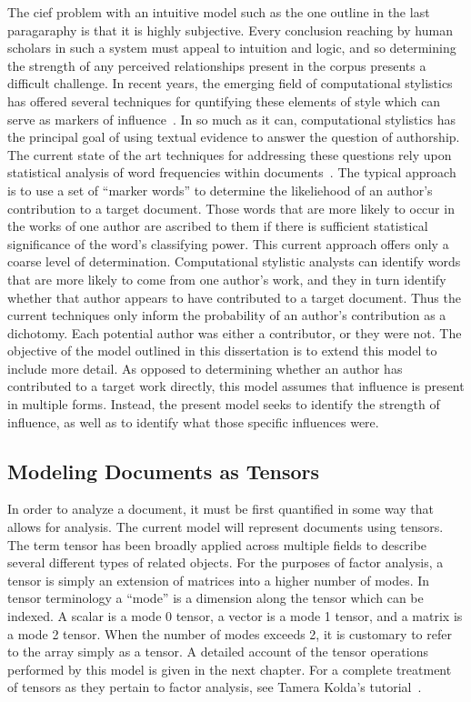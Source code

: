 \documentclass[../dissertation.tex]{subfiles}
\begin{document}
The cief problem with an intuitive model such as the one outline in
the last paragaraphy is that it is highly subjective.  Every
conclusion reaching by human scholars in such a system must appeal to
intuition and logic, and so determining the strength of any perceived
relationships present in the corpus presents a difficult challenge.
In recent years, the emerging field of computational stylistics has
offered several techniques for quntifying these elements of style
which can serve as markers of influence~\cite{TODO: computation
  stylistics papers}.  In so much as it can, computational stylistics
has the principal goal of using textual evidence to answer the
question of authorship.  The current state of the art techniques for
addressing these questions rely upon statistical analysis of word
frequencies within documents~\cite {TODO: word-frequencies gold}.  The
typical approach is to use a set of ``marker words'' to determine the
likeliehood of an author's contribution to a target document.  Those
words that are more likely to occur in the works of one author are
ascribed to them if there is sufficient statistical significance of
the word's classifying power.  This current approach offers only a
coarse level of determination.  Computational stylistic analysts can
identify words that are more likely to come from one author's work,
and they in turn identify whether that author appears to have
contributed to a target document.  Thus the current techniques only
inform the probability of an author's contribution as a dichotomy.
Each potential author was either a contributor, or they were not.
The objective of the model outlined in this dissertation is to extend
this model to include more detail.  As opposed to determining whether
an author has contributed to a target work directly, this model
assumes that influence is present in multiple forms.  Instead, the
present model seeks to identify the strength of influence, as well as
to identify what those specific influences were.

\subsection{Modeling Documents as Tensors}
In order to analyze a document, it must be first quantified in some
way that allows for analysis.  The current model will represent
documents using tensors.  The term tensor has been broadly applied
across multiple fields to describe several different types of related
objects.  For the purposes of factor analysis, a tensor is simply an
extension of matrices into a higher number of modes. In tensor
terminology a ``mode'' is a dimension along the tensor which can be
indexed.  A scalar is a mode 0 tensor, a vector is a mode 1 tensor,
and a matrix is a mode 2 tensor.  When the number of modes exceeds 2,
it is customary to refer to the array simply as a tensor.  A detailed
account of the tensor operations performed by this model is given in
the next chapter.  For a complete treatment of tensors as they pertain
to factor analysis, see Tamera Kolda's tutorial~\cite{kolda}.
\end{document}
